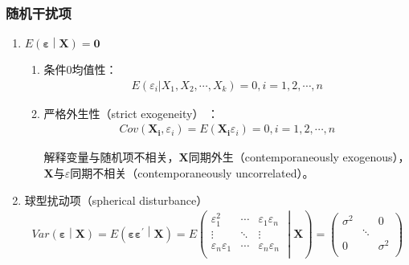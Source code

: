 \documentclass[12pt]{book}
\begin{document}
\subsubsection{随机干扰项}

\begin{enumerate}[1.]
    \item $E\left(\bm{\varepsilon}\middle|\bm{X}\right)=\bm{0}$
          \begin{enumerate}[(1)]
              \item 条件0均值性：
                    \begin{gather*}
                        E\left(\varepsilon_i|X_1,X_2,\cdots,X_k\right)=0, i=1,2,\cdots,n
                    \end{gather*}
              \item 严格外生性（strict exogeneity） ：
                    \begin{gather*}
                        Cov\left(\mathbf{X_i},\varepsilon_i\right)=E(\mathbf{X_i}\varepsilon_{i})=0, i=1,2,\cdots,n
                    \end{gather*}
                    \par 解释变量与随机项不相关，$\bm{X}$同期外生（contemporaneously exogenous），$\bm{X}$与$\varepsilon$同期不相关（contemporaneously uncorrelated）。
          \end{enumerate}
    \item 球型扰动项（spherical disturbance）
          \begin{gather*}
              Var\left(\bm{\varepsilon}\middle|\bm{X} \right)
              =E\left( \bm{\varepsilon}\bm{\varepsilon}^\prime\middle|\bm{X} 	\right)
              =E\left( \begin{matrix}
                  \varepsilon_1^2            & \cdots & \varepsilon_1\varepsilon_n \\\vdots&\ddots&\vdots\\
                  \varepsilon_n\varepsilon_1 & \cdots & \varepsilon_n\varepsilon_n \\
              \end{matrix} \middle|\bm{X}\right)
              =\left(\begin{matrix}
                      \sigma^2 & \      & 0        \\
                      \        & \ddots & \        \\
                      0        & \      & \sigma^2 \\
                  \end{matrix}\right)

\end{gather*}
\end{enumerate}
\end{document}

